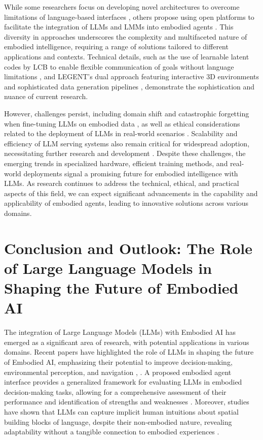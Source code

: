 \documentclass[conference]{IEEEtran}
\begin{document}
While some researchers focus on developing novel architectures to overcome limitations of language-based interfaces \cite{b3}, others propose using open platforms to facilitate the integration of LLMs and LMMs into embodied agents \cite{b4}. This diversity in approaches underscores the complexity and multifaceted nature of embodied intelligence, requiring a range of solutions tailored to different applications and contexts. Technical details, such as the use of learnable latent codes by LCB to enable flexible communication of goals without language limitations \cite{b3}, and LEGENT's dual approach featuring interactive 3D environments and sophisticated data generation pipelines \cite{b4}, demonstrate the sophistication and nuance of current research.

However, challenges persist, including domain shift and catastrophic forgetting when fine-tuning LLMs on embodied data \cite{b3}, as well as ethical considerations related to the deployment of LLMs in real-world scenarios \cite{b5}. Scalability and efficiency of LLM serving systems also remain critical for widespread adoption, necessitating further research and development \cite{b1}. Despite these challenges, the emerging trends in specialized hardware, efficient training methods, and real-world deployments signal a promising future for embodied intelligence with LLMs. As research continues to address the technical, ethical, and practical aspects of this field, we can expect significant advancements in the capability and applicability of embodied agents, leading to innovative solutions across various domains.

\section{Conclusion and Outlook: The Role of Large Language Models in Shaping the Future of Embodied AI}
The integration of Large Language Models (LLMs) with Embodied AI has emerged as a significant area of research, with potential applications in various domains. Recent papers have highlighted the role of LLMs in shaping the future of Embodied AI, emphasizing their potential to improve decision-making, environmental perception, and navigation \cite{b1}, \cite{b3}. A proposed embodied agent interface provides a generalized framework for evaluating LLMs in embodied decision-making tasks, allowing for a comprehensive assessment of their performance and identification of strengths and weaknesses \cite{b1}. Moreover, studies have shown that LLMs can capture implicit human intuitions about spatial building blocks of language, despite their non-embodied nature, revealing adaptability without a tangible connection to embodied experiences \cite{b2}.
\end{document}
